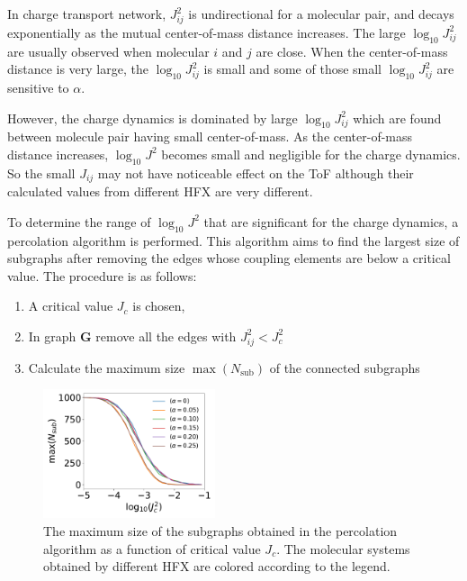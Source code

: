 \documentclass[%
 reprint,
 amsmath,amssymb,
 aps,
]{revtex4-2}
\begin{document}
In charge transport network, $J_{ij}^2$ is undirectional for a molecular pair, and decays exponentially as the mutual center-of-mass distance increases. The large $\log_{10} J_{ij}^2$ are usually observed when molecular $i$ and $j$ are close.
When the center-of-mass distance is very large, the $\log_{10} J_{ij}^2$ is small and some of those small $\log_{10} J_{ij}^2$ are sensitive to $\alpha$. 

However, the charge dynamics is dominated by large $\log_{10} J_{ij}^2$ which are found between molecule pair having small center-of-mass. As the center-of-mass distance increases, $\log_{10} J^2$ becomes small and negligible for the charge dynamics. So the small $J_{ij}$ may not have noticeable effect on the ToF although their calculated values from different HFX are very different. 

To determine the range of $\log_{10} J^2$ that are significant for the charge dynamics, a percolation algorithm is performed. This algorithm aims to find the largest size of subgraphs after removing the edges whose coupling elements are below a critical value. The procedure is as follows:
\begin{enumerate}
    \item A critical value $J_c$ is chosen,
    \item In graph $\mathbf{G}$ remove all the edges with $J_{ij}^2 < J_c^2$
    \item Calculate the maximum size $\max({N_\text{sub}})$ of the connected subgraphs
\end{enumerate}

\begin{figure}[btp]
  \centering
  \includegraphics[width=0.45\textwidth]{figs/fig_network_all.pdf}
  \caption{The maximum size of the subgraphs obtained in the percolation algorithm as a function of critical value $J_c$. The molecular systems obtained by different HFX are colored according to the legend.}
  \label{fig:J_percolate}
\end{figure}
\end{document}
